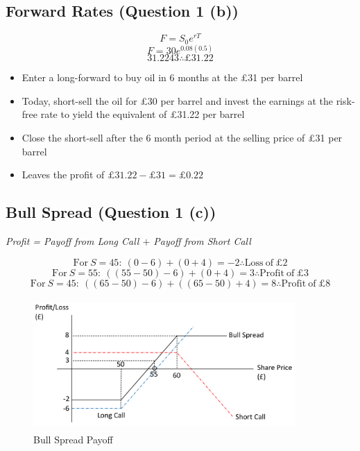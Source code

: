 \documentclass[11pt, english]{article}
\begin{document}
	\subsection{Forward Rates (Question 1 (b))}

	$$F=S_0e^{rT}$$
	$$F=30e^{0.08(0.5)}$$
	$$31.2243\therefore\pounds31.22$$

	\begin{itemize}
	\setlength\itemsep{0cm}
		\item Enter a long-forward to buy oil in 6 months at the \pounds31 per barrel	
		\item Today, short-sell the oil for \pounds30 per barrel and invest the earnings at the risk-free rate to yield the equivalent of \pounds31.22 per barrel
		\item Close the short-sell after the 6 month period at the selling price of \pounds31 per barrel
		\item Leaves the profit of $\pounds31.22-\pounds31=\pounds0.22$
	\end{itemize}

	\subsection{Bull Spread (Question 1 (c))}

	\textit{Profit = Payoff from Long Call $+$ Payoff from Short Call}

	$$\mathrm{For}\ S=45:\ (0-6)+(0+4)=-2\therefore \mathrm{Loss\ of}\ \pounds2$$
	$$\mathrm{For}\ S=55:\ ((55-50)-6)+(0+4)=3\therefore \mathrm{Profit\ of}\ \pounds3$$
	$$\mathrm{For}\ S=45:\ ((65-50)-6)+((65-50)+4)=8\therefore \mathrm{Profit\ of}\ \pounds8$$

	\begin{figure}[H]
        \begin{center}                                                  
                \includegraphics[height=5cm,width=10cm]{AG313-IMG/b.png}
        \end{center}              
                \caption{Bull Spread Payoff}
        \end{figure}
\end{document}
